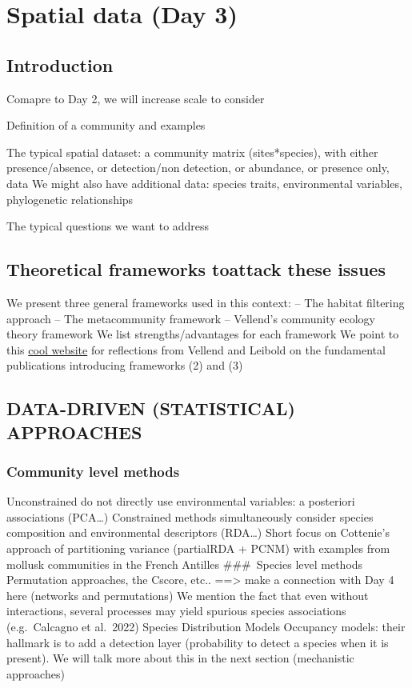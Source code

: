 \documentclass[
]{book}
\theoremstyle{definition}
\theoremstyle{definition}
\theoremstyle{definition}
\theoremstyle{definition}
\theoremstyle{remark}
\begin{document}
\chapter{Spatial data (Day 3)}\label{spatial-data-day-3}

\section{Introduction}\label{introduction}

Comapre to Day 2, we will increase scale to consider

Definition of a community and examples

The typical spatial dataset: a community matrix (sites*species), with either presence/absence, or detection/non detection, or abundance, or presence only, data
We might also have additional data: species traits, environmental variables, phylogenetic relationships

The typical questions we want to address

\section{Theoretical frameworks toattack these issues}\label{theoretical-frameworks-toattack-these-issues}

We present three general frameworks used in this context:
-- The habitat filtering approach
-- The metacommunity framework
-- Vellend's community ecology theory framework
We list strengths/advantages for each framework
We point to this \href{https://reflectionsonpaperspast.wordpress.com/}{cool website} for reflections from Vellend and Leibold on the fundamental publications introducing frameworks (2) and (3)

\section{DATA-DRIVEN (STATISTICAL) APPROACHES}\label{data-driven-statistical-approaches}

\subsection{Community level methods}\label{community-level-methods}

Unconstrained do not directly use environmental variables: a posteriori associations (PCA\ldots)
Constrained methods simultaneously consider species composition and environmental descriptors (RDA\ldots)
Short focus on Cottenie's approach of partitioning variance (partialRDA + PCNM) with examples from mollusk communities in the French Antilles
\#\#\#~Species level methods
Permutation approaches, the Cscore, etc.. ==\textgreater{} make a connection with Day 4 here (networks and permutations)
We mention the fact that even without interactions, several processes may yield spurious species associations (e.g.~Calcagno et al.~2022)
Species Distribution Models
Occupancy models: their hallmark is to add a detection layer (probability to detect a species when it is present). We will talk more about this in the next section (mechanistic approaches)
\end{document}
